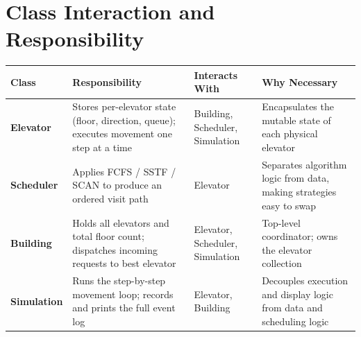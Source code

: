 \documentclass[a4paper,11pt]{article}
\begin{document}
\section{Class Interaction and Responsibility}

\begin{tabular}{>{\bfseries}p{2.2cm} p{3.6cm} p{2.8cm} p{4cm}}
\toprule
Class & Responsibility & Interacts With & Why Necessary \\
\midrule
Elevator   & Stores per-elevator state (floor, direction, queue); executes movement one step at a time & Building, Scheduler, Simulation & Encapsulates the mutable state of each physical elevator \\
Scheduler  & Applies FCFS / SSTF / SCAN to produce an ordered visit path & Elevator & Separates algorithm logic from data, making strategies easy to swap \\
Building   & Holds all elevators and total floor count; dispatches incoming requests to best elevator & Elevator, Scheduler, Simulation & Top-level coordinator; owns the elevator collection \\
Simulation & Runs the step-by-step movement loop; records and prints the full event log & Elevator, Building & Decouples execution and display logic from data and scheduling logic \\
\bottomrule
\end{tabular}
\end{document}
